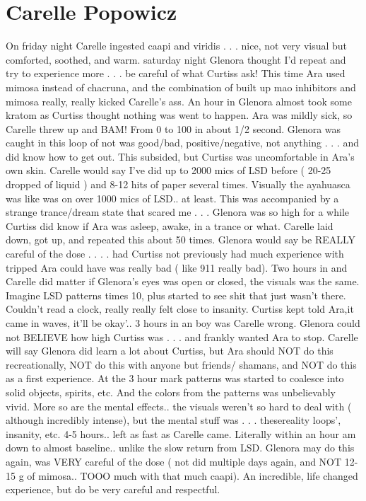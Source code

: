 \documentclass[12pt]{book}
\begin{document}
\chapter{Carelle Popowicz}

On friday night Carelle ingested caapi and viridis . . .  nice, not very visual but comforted, soothed, and warm. saturday night Glenora thought I'd repeat and try to experience more . . .  be careful of what Curtiss ask! This time Ara used mimosa instead of chacruna, and the combination of built up mao inhibitors and mimosa really, really kicked Carelle's ass. An hour in Glenora almost took some kratom as Curtiss thought nothing was went to happen. Ara was mildly sick, so Carelle threw up and BAM! From 0 to 100 in about 1/2 second. Glenora was caught in this loop of not was good/bad, positive/negative, not anything . . .  and did know how to get out. This subsided, but Curtiss was uncomfortable in Ara's own skin. Carelle would say I've did up to 2000 mics of LSD before ( 20-25 dropped of liquid ) and 8-12 hits of paper several times. Visually the ayahuasca was like was on over 1000 mics of LSD.. at least. This was accompanied by a strange trance/dream state that scared me . . .  Glenora was so high for a while Curtiss did know if Ara was asleep, awake, in a trance or what. Carelle laid down, got up, and repeated this about 50 times. Glenora would say be REALLY careful of the dose . . .  . had Curtiss not previously had much experience with tripped Ara could have was really bad ( like 911 really bad). Two hours in and Carelle did matter if Glenora's eyes was open or closed, the visuals was the same. Imagine LSD patterns times 10, plus started to see shit that just wasn't there. Couldn't read a clock, really really felt close to insanity. Curtiss kept told Ara,it came in waves, it'll be okay'.. 3 hours in an boy was Carelle wrong. Glenora could not BELIEVE how high Curtiss was . . .  and frankly wanted Ara to stop. Carelle will say Glenora did learn a lot about Curtiss, but Ara should NOT do this recreationally, NOT do this with anyone but friends/ shamans, and NOT do this as a first experience. At the 3 hour mark patterns was started to coalesce into solid objects, spirits, etc. And the colors from the patterns was unbelievably vivid. More so are the mental effects.. the visuals weren't so hard to deal with ( although incredibly intense), but the mental stuff was . . .  thesereality loops', insanity, etc. 4-5 hours.. left as fast as Carelle came. Literally within an hour am down to almost baseline.. unlike the slow return from LSD. Glenora may do this again, was VERY careful of the dose ( not did multiple days again, and NOT 12-15 g of mimosa.. TOOO much with that much caapi). An incredible, life changed experience, but do be very careful and respectful.
\end{document}
